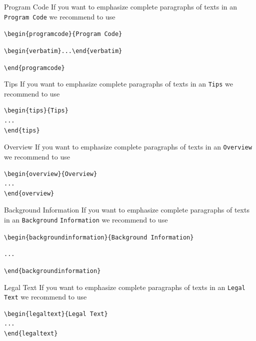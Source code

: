 \documentclass[graybox]{SNmult}
\begin{document}
\begin{programcode}{Program Code}
If you want to emphasize complete paragraphs of texts in an \verb|Program Code| we recommend to
use

\verb|\begin{programcode}{Program Code}|

\verb|\begin{verbatim}...\end{verbatim}|

\verb|\end{programcode}|

\end{programcode}
%
\begin{tips}{Tips}
If you want to emphasize complete paragraphs of texts in an \verb|Tips| we recommend to
use  \begin{verbatim}\begin{tips}{Tips}
...
\end{tips}\end{verbatim}
\end{tips}
\eject
%
\begin{overview}{Overview}
If you want to emphasize complete paragraphs of texts in an \verb|Overview| we recommend to
use  \begin{verbatim}\begin{overview}{Overview}
...
\end{overview}\end{verbatim}
\end{overview}
\begin{backgroundinformation}{Background Information}
If you want to emphasize complete paragraphs of texts in an \verb|Background|
\verb|Information| we recommend to
use

\verb|\begin{backgroundinformation}{Background Information}|

\verb|...|

\verb|\end{backgroundinformation}|
\end{backgroundinformation}
\begin{legaltext}{Legal Text}
If you want to emphasize complete paragraphs of texts in an \verb|Legal Text| we recommend to
use  \begin{verbatim}\begin{legaltext}{Legal Text}
...
\end{legaltext}\end{verbatim}
\end{legaltext}
\end{document}

